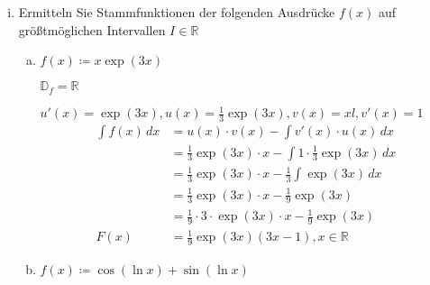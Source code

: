 \documentclass{article}
\begin{document}
\begin{enumerate}[(i)]
\item Ermitteln Sie Stammfunktionen der folgenden Ausdrücke $f(x)$ auf größtmöglichen
  Intervallen $I \in \mathbb{R}$
  \begin{enumerate}[a)]
  \item $f(x) \coloneqq x \exp(3x)$

    \label{dia:3.1.a}

    $\mathbb{D}_f = \mathbb{R}$

    $u'(x) = \exp(3x), u(x) = \frac{1}{3} \exp(3x), v(x) = x l, v'(x) = 1$
    \begin{align*}
      \int f(x)\,dx &= u(x) \cdot v(x) - \int v'(x) \cdot u(x) \,dx \\
                    &= \frac{1}{3} \exp(3x) \cdot x  - \int 1 \cdot \frac{1}{3}\exp(3x) \,dx \\
                    &= \frac{1}{3} \exp(3x) \cdot x  - \frac{1}{3} \int \exp(3x) \,dx \\
                    &= \frac{1}{3} \exp(3x) \cdot x  - \frac{1}{9} \exp(3x) \\
                    &= \frac{1}{9} \cdot 3 \cdot \exp(3x) \cdot x  - \frac{1}{9} \exp(3x) \\
      F(x) &= \frac{1}{9} \exp(3x) (3x - 1), x \in \mathbb{R}
    \end{align*}

  \newpage
  \item $f(x) \coloneqq \cos(\ln x) + \sin(\ln x)$

    \label{dia:3.1.b}


\end{enumerate}
\end{enumerate}
\end{document}
